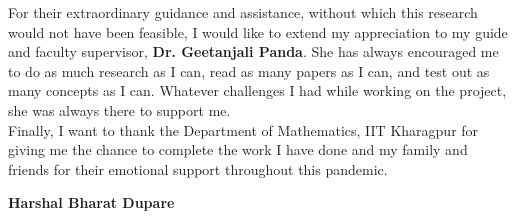 % 
\begin{acknowledgements}

For their extraordinary guidance and assistance, without which this research would not have been feasible, I would like to extend my appreciation to my guide and faculty supervisor, \textbf{Dr. Geetanjali Panda}. She has always encouraged me to do as much research as I can, read as many papers as I can, and test out as many concepts as I can. Whatever challenges I had while working on the project, she was always there to support me.\\

Finally, I want to thank the Department of Mathematics, IIT Kharagpur for giving me the chance to complete the work I have done and my family and friends for their emotional support throughout this pandemic.
\\[1cm]
\begin{flushright}
\textbf{Harshal Bharat Dupare}
\end{flushright}

\end{acknowledgements}